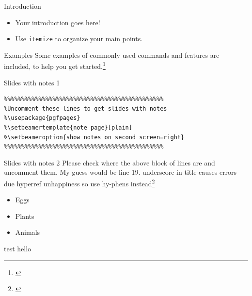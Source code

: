 \documentclass{beamer}
\begin{document}
\begin{frame}{Introduction}

\begin{itemize}
  \item Your introduction goes here!
  \item Use \texttt{itemize} to organize your main points.
\end{itemize}

\vskip 1cm

\begin{block}{Examples}
Some examples of commonly used commands and features are included, to help you get started.\footnote{\cite{nielsen2004quantum}}
\end{block}

\end{frame}
\begin{frame}[fragile]{Slides with notes 1 }

\begin{verbatim}
%%%%%%%%%%%%%%%%%%%%%%%%%%%%%%%%%%%%%%%%%%%%%%
%Uncomment these lines to get slides with notes
%\usepackage{pgfpages}
%\setbeamertemplate{note page}[plain]
%\setbeameroption{show notes on second screen=right}
%%%%%%%%%%%%%%%%%%%%%%%%%%%%%%%%%%%%%%%%%%%%%%     
\end{verbatim}


 
\end{frame}
\begin{frame}{Slides with notes 2}
Please check where the above block of lines are and uncomment them. My guess would be line 19. underscore in title causes errors due hyperref unhappiness %
 so use hy-phens instead\footnote{\cite{zhu1998rapid}}
\end{frame}
\begin{frame}


\begin{itemize}
  \item<1-> Eggs
  \item<2-> Plants
  \item<3-> Animals
\end{itemize}

\end{frame}
\begin{frame}{test}
hello
\end{frame}
\end{document}
